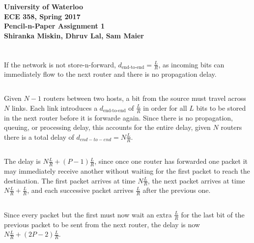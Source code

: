 \documentclass[12pt]{article}
\newcommand{\class}{ECE 358}
\newcommand{\subtitle}{Pencil-n-Paper Assignment 1}
\begin{document}
\begin{center}
{\Large\bf University of Waterloo}\\
\vspace{3mm}
{\Large\bf \class, Spring 2017}\\
\vspace{2mm}
{\Large\bf \subtitle}\\
\vspace{3mm}
\textbf{Shiranka Miskin, Dhruv Lal, Sam Maier}
\end{center}

\section{}
\subsection{}
If the network is not store-n-forward, $d_{\text{end-to-end}} = \frac{L}{R}$, as
incoming bits can immediately flow to the next router and there is no
propagation delay.

\subsection{}
Given $N - 1$ routers between two hosts, a bit from the source must travel
across $N$ links.  Each link introduces a $d_{\text{end-to-end}}$ of
$\frac{L}{R}$ in order for all $L$ bits to be stored in the next router before
it is forwarde again.  Since there is no propagation, queuing, or processing
delay, this accounts for the entire delay, given $N$ routers there is a total delay of
$d_{end-to-end} = N\frac{L}{R}$.


\subsection{}
The delay is $N\frac{L}{R} + (P - 1)\frac{L}{R}$, since once one router has
forwarded one packet it may immediately receive another without waiting for the
first packet to reach the destination.  The first packet arrives at time
$N\frac{L}{R}$, the next packet arrives at time $N\frac{L}{R} + \frac{L}{R}$,
and each successive packet arrives $\frac{L}{R}$ after the previous one.

\subsection{}
Since every packet but the first must now wait an extra $\frac{L}{R}$ for the
last bit of the previous packet to be sent from the next router, the delay is
now $N\frac{L}{R} + (2P - 2)\frac{L}{R}$.
\end{document}
